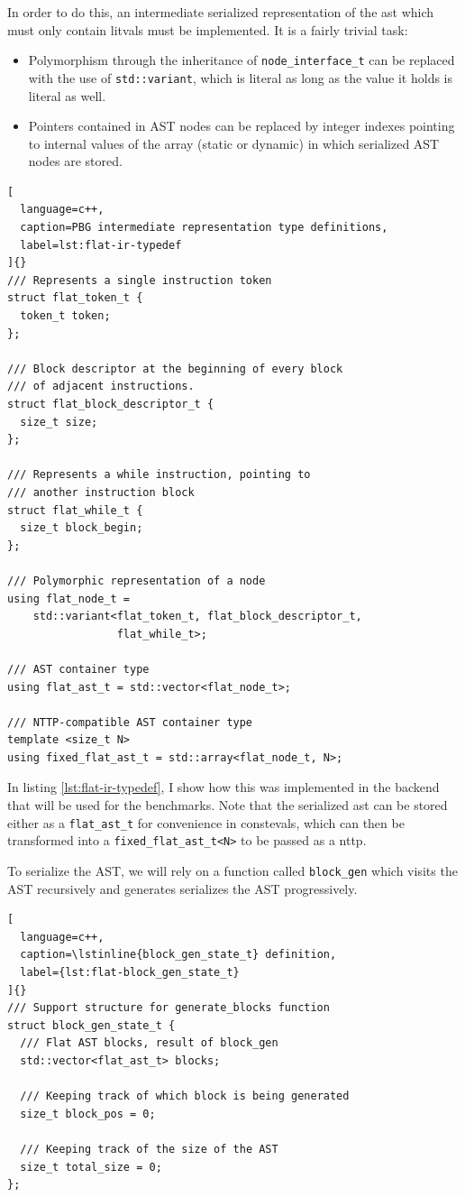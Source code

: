 \documentclass[../main]{subfiles}
\begin{document}
In order to do this, an intermediate serialized representation of the \gls{ast}
which must only contain \glspl{litval} must be implemented.
It is a fairly trivial task:

\begin{itemize}
\item
Polymorphism through the inheritance of \lstinline{node_interface_t}
can be replaced with the use of \lstinline{std::variant}, which is literal
as long as the value it holds is literal as well.

\item
Pointers contained in AST nodes can be replaced by integer indexes pointing to
internal values of the array (static or dynamic) in which serialized
AST nodes are stored.
\end{itemize}

\begin{lstlisting}[
  language=c++,
  caption=PBG intermediate representation type definitions,
  label=lst:flat-ir-typedef
]{}
/// Represents a single instruction token
struct flat_token_t {
  token_t token;
};

/// Block descriptor at the beginning of every block
/// of adjacent instructions.
struct flat_block_descriptor_t {
  size_t size;
};

/// Represents a while instruction, pointing to
/// another instruction block
struct flat_while_t {
  size_t block_begin;
};

/// Polymorphic representation of a node
using flat_node_t =
    std::variant<flat_token_t, flat_block_descriptor_t,
                 flat_while_t>;

/// AST container type
using flat_ast_t = std::vector<flat_node_t>;

/// NTTP-compatible AST container type
template <size_t N>
using fixed_flat_ast_t = std::array<flat_node_t, N>;
\end{lstlisting}

In listing \ref{lst:flat-ir-typedef}, I show how this was implemented in the
backend that will be used for the benchmarks.
Note that the serialized \gls{ast} can be stored either as a
\lstinline{flat_ast_t} for convenience in \glspl{consteval},
which can then be transformed into a \lstinline{fixed_flat_ast_t<N>}
to be passed as a \gls{nttp}.

To serialize the AST, we will rely on a function called \lstinline{block_gen}
which visits the AST recursively and generates serializes the AST progressively.

\begin{lstlisting}[
  language=c++,
  caption=\lstinline{block_gen_state_t} definition,
  label={lst:flat-block_gen_state_t}
]{}
/// Support structure for generate_blocks function
struct block_gen_state_t {
  /// Flat AST blocks, result of block_gen
  std::vector<flat_ast_t> blocks;

  /// Keeping track of which block is being generated
  size_t block_pos = 0;

  /// Keeping track of the size of the AST
  size_t total_size = 0;
};
\end{lstlisting}
\end{document}
